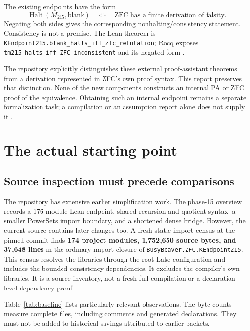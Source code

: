 \documentclass[11pt,letterpaper]{article}
\theoremstyle{definition}
\theoremstyle{remark}
\newcommand{\code}[1]{\texttt{#1}}
\begin{document}
The existing endpoints have the form
\[
 \operatorname{Halt}(M_{215},\mathrm{blank})
 \quad\Longleftrightarrow\quad
 \text{ZFC has a finite derivation of falsity}.
\]
Negating both sides gives the corresponding nonhalting/consistency statement.
Consistency is not a premise. The Lean theorem is
\code{KEndpoint215.blank\_halts\_iff\_zfc\_refutation}; Rocq exposes
\code{tm215\_halts\_iff\_ZFC\_inconsistent} and its negated form
\cite{endpoint,rocqendpoint}.

The repository explicitly distinguishes these external proof-assistant
theorems from a derivation represented in ZFC's own proof syntax. This report
preserves that distinction. None of the new components constructs an internal
PA or ZFC proof of the equivalence. Obtaining such an internal endpoint remains
a separate formalization task; a compilation or an assumption report alone
does not supply it \cite{verification}.

\section{The actual starting point}

\subsection{Source inspection must precede comparisons}

The repository has extensive earlier simplification work. The phase-15
overview records a 176-module Lean endpoint, shared recursion and quotient
syntax, a smaller PowerSets import boundary, and a shortened dense bridge.
However, the current source contains later changes too. A fresh static import
census at the pinned commit finds \textbf{174 project modules, 1,752,650 source
bytes, and 37,648 lines} in the ordinary import closure of
\code{BusyBeaver.ZFC.KEndpoint215}. This census resolves the libraries through
the root Lake configuration and includes the bounded-consistency dependencies.
It excludes the compiler's own libraries. It is a source inventory, not a
fresh full compilation or a declaration-level dependency proof.

Table~\ref{tab:baseline} lists particularly relevant observations. The byte
counts measure complete files, including comments and generated declarations.
They must not be added to historical savings attributed to earlier packets.
\end{document}

